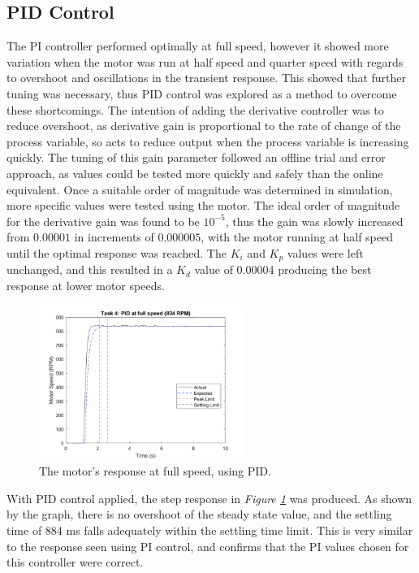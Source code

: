 \documentclass[11pt, onecolumn]{article}
\begin{document}
\subsection*{PID Control}
\par The PI controller performed optimally at full speed, however it showed more variation when the motor was run at half speed and quarter speed with regards to overshoot and oscillations in the transient response. This showed that further tuning was necessary, thus PID control was explored as a method to overcome these shortcomings. The intention of adding the derivative controller was to reduce overshoot, as derivative gain is proportional to the rate of change of the process variable, so acts to reduce output when the process variable is increasing quickly. The tuning of this gain parameter followed an offline trial and error approach, as values could be tested more quickly and safely than the online equivalent. Once a suitable order of magnitude was determined in simulation, more specific values were tested using the motor. The ideal order of magnitude for the derivative gain was found to be $10^{-5}$, thus the gain was slowly increased from $0.00001$ in increments of $0.000005$, with the motor running at half speed until the optimal response was reached. The $K_i$ and $K_p$ values were left unchanged, and this resulted in a $K_d$ value of 0.00004 producing the best response at lower motor speeds.
\begin{figure}[h!]
    \centering
    \includegraphics[width=0.6\textwidth]{q4-pid1.png}
    \caption{The motor's response at full speed, using PID.}
    \label{fig:q4-pid1}
\end{figure}
\par With PID control applied, the step response in \textit{Figure \ref{fig:q4-pid1}} was produced. As shown by the graph, there is no overshoot of the steady state value, and the settling time of 884 ms falls adequately within the settling time limit. This is very similar to the response seen using PI control, and confirms that the PI values chosen for this controller were correct.
\end{document}
